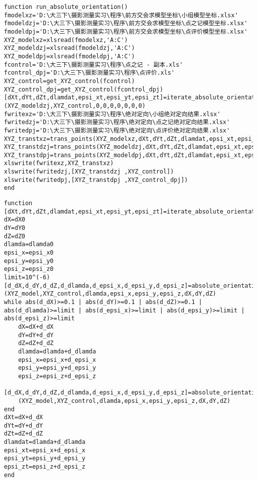 \begin{lstlisting}[caption=run\_absolute\_orientation.m]
function run_absolute_orientation()
fmodelxz='D:\大三下\摄影测量实习\程序\前方交会求模型坐标\小组模型坐标.xlsx'
fmodeldzj='D:\大三下\摄影测量实习\程序\前方交会求模型坐标\点之记模型坐标.xlsx'
fmodeldpj='D:\大三下\摄影测量实习\程序\前方交会求模型坐标\点评价模型坐标.xlsx'
XYZ_modelxz=xlsread(fmodelxz,'A:C')
XYZ_modeldzj=xlsread(fmodeldzj,'A:C')
XYZ_modeldpj=xlsread(fmodeldpj,'A:C')
fcontrol='D:\大三下\摄影测量实习\程序\点之记 - 副本.xls'
fcontrol_dpj='D:\大三下\摄影测量实习\程序\点评价.xls'
XYZ_control=get_XYZ_control(fcontrol)
XYZ_control_dpj=get_XYZ_control(fcontrol_dpj)
[dXt,dYt,dZt,dlamdat,epsi_xt,epsi_yt,epsi_zt]=iterate_absolute_orientation
(XYZ_modeldzj,XYZ_control,0,0,0,0,0,0,0)
fwritexz='D:\大三下\摄影测量实习\程序\绝对定向\小组绝对定向结果.xlsx'
fwritedzj='D:\大三下\摄影测量实习\程序\绝对定向\点之记绝对定向结果.xlsx'
fwritedpj='D:\大三下\摄影测量实习\程序\绝对定向\点评价绝对定向结果.xlsx'
XYZ_transtxz=trans_points(XYZ_modelxz,dXt,dYt,dZt,dlamdat,epsi_xt,epsi_yt,epsi_zt)
XYZ_transtdzj=trans_points(XYZ_modeldzj,dXt,dYt,dZt,dlamdat,epsi_xt,epsi_yt,epsi_zt)
XYZ_transtdpj=trans_points(XYZ_modeldpj,dXt,dYt,dZt,dlamdat,epsi_xt,epsi_yt,epsi_zt)
xlswrite(fwritexz,XYZ_transtxz)
xlswrite(fwritedzj,[XYZ_transtdzj ,XYZ_control])
xlswrite(fwritedpj,[XYZ_transtdpj ,XYZ_control_dpj])
end
\end{lstlisting}

\begin{lstlisting}[caption=iterate\_absolute\_orientation.m]
function [dXt,dYt,dZt,dlamdat,epsi_xt,epsi_yt,epsi_zt]=iterate_absolute_orientation(XYZ_model,XYZ_control,dX0,dY0,dZ0,dlamda0,epsi_x0,epsi_y0,epsi_z0)
dX=dX0
dY=dY0
dZ=dZ0
dlamda=dlamda0
epsi_x=epsi_x0
epsi_y=epsi_y0
epsi_z=epsi_z0
limit=10^(-6)
[d_dX,d_dY,d_dZ,d_dlamda,d_epsi_x,d_epsi_y,d_epsi_z]=absolute_orientation
(XYZ_model,XYZ_control,dlamda,epsi_x,epsi_y,epsi_z,dX,dY,dZ)
while abs(d_dX)>=0.1 | abs(d_dY)>=0.1 | abs(d_dZ)>=0.1 | abs(d_dlamda)>=limit | abs(d_epsi_x)>=limit | abs(d_epsi_y)>=limit | abs(d_epsi_z)>=limit
    dX=dX+d_dX
    dY=dY+d_dY
    dZ=dZ+d_dZ
    dlamda=dlamda+d_dlamda
    epsi_x=epsi_x+d_epsi_x
    epsi_y=epsi_y+d_epsi_y
    epsi_z=epsi_z+d_epsi_z
    [d_dX,d_dY,d_dZ,d_dlamda,d_epsi_x,d_epsi_y,d_epsi_z]=absolute_orientation
    (XYZ_model,XYZ_control,dlamda,epsi_x,epsi_y,epsi_z,dX,dY,dZ)
end
dXt=dX+d_dX
dYt=dY+d_dY
dZt=dZ+d_dZ
dlamdat=dlamda+d_dlamda
epsi_xt=epsi_x+d_epsi_x
epsi_yt=epsi_y+d_epsi_y
epsi_zt=epsi_z+d_epsi_z
end     
\end{lstlisting}

